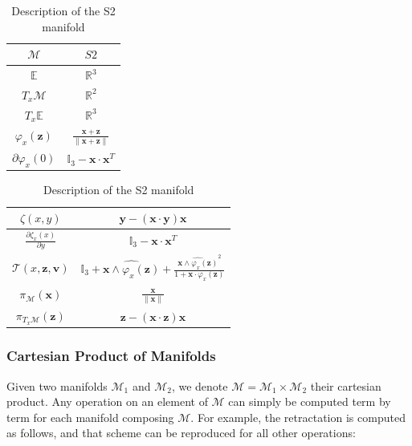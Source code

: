 \begin{table} [H]
\caption{Description of the S2 manifold}
\centering
\begin{tabular}{cc}
  \toprule
  $\mathcal{M}$ & $S2$ \\
  \midrule
  $\mathbb{E}$ & $\mathbb{R}^{3}$ \\
  \midrule
  $T_x\mathcal{M}$ & $\mathbb{R}^2$ \\
  \midrule
  $T_x\mathbb{E}$ & $\mathbb{R}^3$ \\
  \midrule
  $\varphi_x(\mathbf{z})$ & $\frac{\mathbf{x}+\mathbf{z}}{\|\mathbf{x}+\mathbf{z}\|}$ \\
  \midrule
  $\partial \varphi_x(0)$ & $\mathbb{I}_3 - \mathbf{x}\cdot\mathbf{x}^T$ \\
  \bottomrule
\end{tabular}
\quad
\begin{tabular}{cc}
  \toprule
  $\zeta(x,y)$ & $\mathbf{y} - (\mathbf{x} \cdot \mathbf{y}) \mathbf{x}$ \\
  \midrule
  $\frac{\partial \zeta_x(x)}{\partial y}$ & $\mathbb{I}_3 -\mathbf{x}\cdot\mathbf{x}^T$ \\
  \midrule
  $\mathcal{T}(x,\mathbf{z}, \mathbf{v})$ & $\mathbb{I}_3 + \widehat{\mathbf{x} \wedge \varphi_x(\mathbf{z})} + \frac{{\widehat{\mathbf{x} \wedge \varphi_x(\mathbf{z})}}^2}{1+\mathbf{x}\cdot\varphi_x(\mathbf{z})}$ \\
  \midrule
  $\pi_\mathcal{M}(\mathbf{x})$ & $\frac{\mathbf{x}}{\|\mathbf{x}\|}$ \\
  \midrule
  $\pi_{T_x\mathcal{M}}(\mathbf{z})$ & $\mathbf{z} - (\mathbf{x} \cdot \mathbf{z}) \mathbf{x}$ \\
  \bottomrule
\end{tabular}
\end{table}

\subsubsection{Cartesian Product of Manifolds}
\label{ssub:Cartesian Product of Manifolds}
Given two manifolds $\mathcal{M}_1$ and $\mathcal{M}_2$, we denote $\mathcal{M}=\mathcal{M}_1\times\mathcal{M}_2$ their cartesian product.
Any operation on an element of $\mathcal{M}$ can simply be computed term by term for each manifold composing $\mathcal{M}$. For example, the retractation is computed as follows, and that scheme can be reproduced for all other operations:

